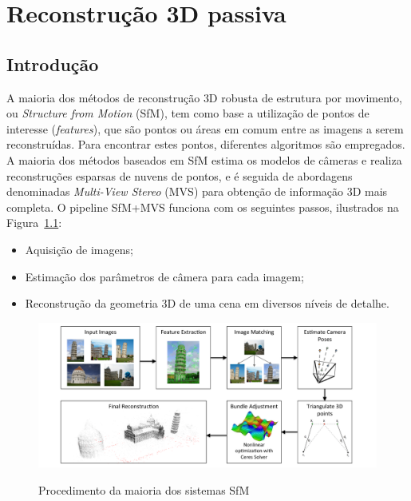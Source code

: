 \doublespacing
\chapter{Reconstrução 3D passiva}\label{cap:pontosdeinteresse}
\doublespacing
\section{Introdução}

A maioria dos métodos de reconstrução 3D robusta de estrutura por movimento, ou \emph{Structure
from Motion} (SfM), tem como base a utilização de pontos de interesse
(\emph{features}), que são pontos ou áreas em comum entre as imagens a serem
reconstruídas. Para encontrar estes pontos, diferentes algoritmos são empregados. 
A maioria dos métodos baseados em SfM estima os modelos de câmeras e
realiza reconstruções esparsas de nuvens de pontos, e é seguida de abordagens denominadas
\emph{Multi-View Stereo} (MVS) para obtenção de informação 3D mais completa.  O
pipeline SfM+MVS funciona com os seguintes passos, ilustrados na Figura~\ref{fig:sfmpipeline}:

\begin{itemize}
\item{Aquisição de imagens;}
\item{Estimação dos parâmetros de câmera para cada imagem;}
\item{Reconstrução da geometria 3D de uma cena em diversos níveis de detalhe.}
\end{itemize}

\begin{figure}[!h]
	\centering
	\caption{Procedimento da maioria dos sistemas SfM}
	\includegraphics[width=\linewidth]{figs/pipelinesfm.png}
   \label{fig:sfmpipeline}
\end{figure}

